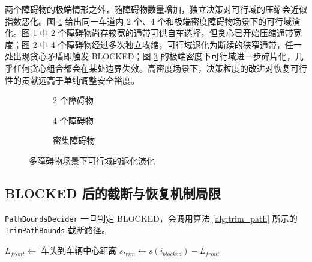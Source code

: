 两个障碍物的极端情形之外，随障碍物数量增加，独立决策对可行域的压缩会近似指数恶化。图 \ref{fig:feasible_compress} 给出同一车道内 2 个、4 个和极端密度障碍物场景下的可行域演化。图 \ref{fig:feasible_compress:a} 中 2 个障碍物尚存较宽的通带可供自车选择，但贪心已开始压缩通带宽度；图 \ref{fig:feasible_compress:b} 中 4 个障碍物经过多次独立收缩，可行域退化为断续的狭窄通带，任一处出现贪心矛盾即触发 BLOCKED；图 \ref{fig:feasible_compress:c} 的极端密度下可行域进一步碎片化，几乎任何贪心组合都会在某处边界失效。高密度场景下，决策粒度的改进对恢复可行性的贡献远高于单纯调整安全裕度。

\begin{figure}[htbp]
\centering
\begin{subfigure}[b]{0.32\textwidth}
  \centering
  \caption{2 个障碍物}
  \label{fig:feasible_compress:a}
\end{subfigure}\hfill
\begin{subfigure}[b]{0.32\textwidth}
  \centering
  \caption{4 个障碍物}
  \label{fig:feasible_compress:b}
\end{subfigure}\hfill
\begin{subfigure}[b]{0.32\textwidth}
  \centering
  \caption{密集障碍物}
  \label{fig:feasible_compress:c}
\end{subfigure}
\caption{多障碍物场景下可行域的退化演化}
\label{fig:feasible_compress}
\end{figure}

\subsection{BLOCKED 后的截断与恢复机制局限}

\texttt{PathBoundsDecider} 一旦判定 BLOCKED，会调用算法 \ref{alg:trim_path} 所示的 \texttt{TrimPathBounds} 截断路径。

\begin{algorithm}[htbp]
\caption{TrimPathBounds路径截断}
\label{alg:trim_path}
$L_{front} \leftarrow$ 车头到车辆中心距离 \;
$s_{trim} \leftarrow s(i_{blocked}) - L_{front}$ \;
\end{algorithm}

